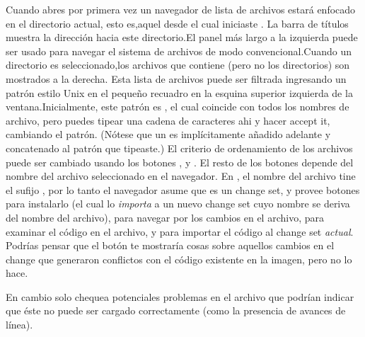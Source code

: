 \documentclass[spanish,a4paper,10pt,twoside]{book}
\begin{document}
Cuando abres por primera vez un navegador de lista de archivos estar\'a enfocado
en el directorio actual, esto es,aquel desde el cual iniciaste \pharo. La
barra de t\'itulos muestra la direcci\'on hacia este directorio.El panel m\'as
largo a la izquierda puede ser usado para navegar el sistema de archivos de modo
convencional.Cuando un directorio es seleccionado,los archivos que contiene
(pero no los directorios) son mostrados a la derecha. Esta lista de archivos
puede ser filtrada ingresando un patrón estilo Unix en el pequeño recuadro en la
esquina superior izquierda de la ventana.Inicialmente, este patr\'on es \ct{*},
el cual coincide con todos los nombres de archivo, pero puedes tipear una
cadena de caracteres ahi y hacer accept it, cambiando el patr\'on. (N\'otese que
un \ct{*} es impl\'icitamente añadido adelante y concatenado al patr\'on que
tipeaste.) El criterio de ordenamiento de los archivos puede ser cambiado
usando los botones ,  y . El resto de
los botones depende del nombre del archivo seleccionado en el navegador. En
 , el nombre del archivo tine el sufijo , por lo
 tanto el navegador asume que es un change set, y provee botones para instalarlo
 (el cual lo \textit{importa} a un nuevo change set
 cuyo nombre se deriva del nombre del archivo), para navegar por los cambios
  en el archivo, para examinar el código  en el
 archivo, y para importar  el c\'odigo al change set
 \emph{actual}. Podr\'ias pensar que el bot\'on  te
 mostrar\'ia cosas sobre aquellos cambios en el change que generaron conflictos
 con el c\'odigo existente en la imagen, pero no lo hace.
 
En cambio solo chequea potenciales problemas en el archivo que podr\'ian
indicar que \'este no puede ser cargado correctamente (como la
presencia de avances de l\'inea).
\end{document}
